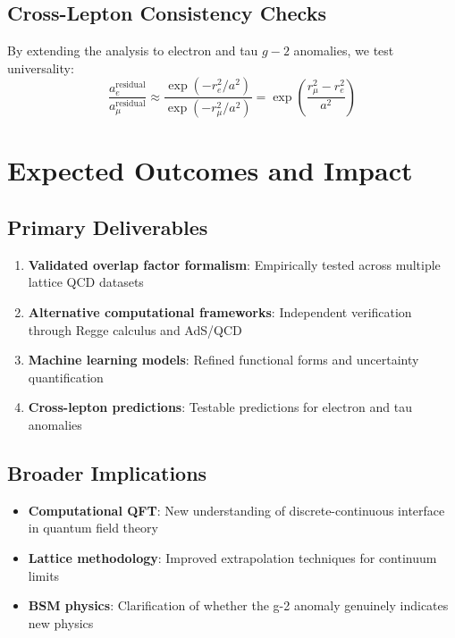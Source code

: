 ﻿\documentclass[12pt]{article}
\theoremstyle{definition}
\theoremstyle{plain}
\begin{document}
\subsection{Cross-Lepton Consistency Checks}


By extending the analysis to electron and tau $g-2$ anomalies, we test universality:
\begin{equation}
\frac{a_e^{\text{residual}}}{a_\mu^{\text{residual}}} \approx \frac{\exp\left(-r_e^2/a^2\right)}{\exp\left(-r_\mu^2/a^2\right)} = \exp\left(\frac{r_\mu^2 - r_e^2}{a^2}\right)
\end{equation}


\section{Expected Outcomes and Impact}


\subsection{Primary Deliverables}
\begin{enumerate}
    \item \textbf{Validated overlap factor formalism}: Empirically tested across multiple lattice QCD datasets
    \item \textbf{Alternative computational frameworks}: Independent verification through Regge calculus and AdS/QCD
    \item \textbf{Machine learning models}: Refined functional forms and uncertainty quantification
    \item \textbf{Cross-lepton predictions}: Testable predictions for electron and tau anomalies
\end{enumerate}


\subsection{Broader Implications}
\begin{itemize}
    \item \textbf{Computational QFT}: New understanding of discrete-continuous interface in quantum field theory
    \item \textbf{Lattice methodology}: Improved extrapolation techniques for continuum limits
    \item \textbf{BSM physics}: Clarification of whether the g-2 anomaly genuinely indicates new physics
\end{itemize}
\end{document}
